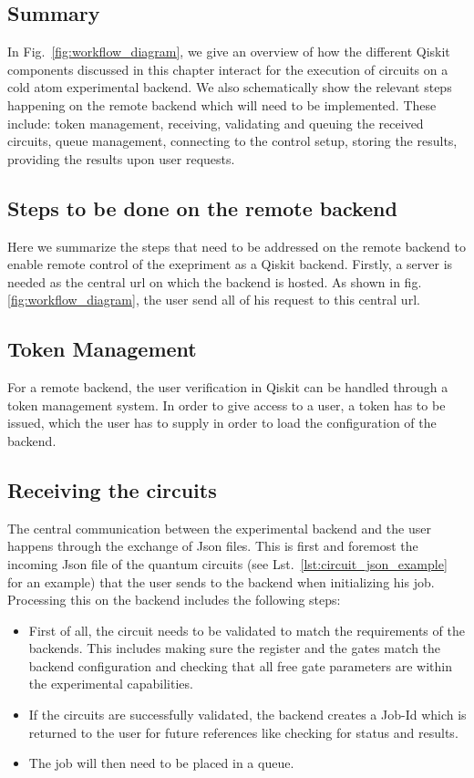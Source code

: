 \documentclass[a4paper, 10pt]{article}
\begin{document}
\subsection{Summary}

In Fig.~\ref{fig:workflow_diagram}, we give an overview of how the different Qiskit components discussed in this chapter interact for the execution of circuits on a cold atom experimental backend.
We also schematically show the relevant steps happening on the remote backend which will need to be implemented.
These include: token management, receiving, validating and queuing the received circuits, queue management, connecting to the control setup, storing the results, providing the results upon user requests.

\subsection{Steps to be done on the remote backend}

Here we summarize the steps that need to be addressed on the remote backend to enable remote control of the exepriment as a Qiskit backend.
Firstly, a server is needed as the central url on which the backend is hosted.
As shown in fig. \ref{fig:workflow_diagram}, the user send all of his request to this central url. 

\subsection{Token Management}
For a remote backend, the user verification in Qiskit can be handled through a token management system.
In order to give access to a user, a token has to be issued, which the user has to supply in order to load the configuration of the backend.

\subsection{Receiving the circuits}
The central communication between the experimental backend and the user happens through the exchange of Json files.
This is first and foremost the incoming Json file of the quantum circuits (see Lst.~\ref{lst:circuit_json_example} for an example) that the user sends to the backend when initializing his job.
Processing this on the backend includes the following steps:
\begin{itemize}
    \item First of all, the circuit needs to be validated to match the requirements of the backends.
    This includes making sure the register and the gates match the backend configuration and checking that all free gate parameters are within the experimental capabilities. 
    \item If the circuits are successfully validated, the backend creates a Job-Id which is returned to the user for future references like checking for status and results. 
    \item The job will then need to be placed in a queue.
\end{itemize}
\end{document}
